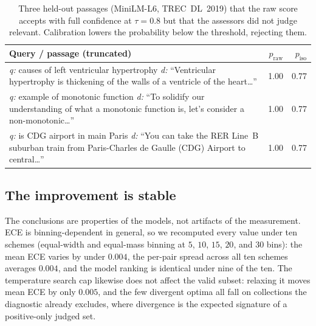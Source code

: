 \documentclass[sigconf,nonacm]{acmart}
\newcommand{\thead}[1]{\textbf{#1}}
\begin{document}
\begin{table}[t]
\centering
\caption{Three held-out passages (MiniLM-L6, TREC~DL~2019) that the raw score accepts
with full confidence at $\tau{=}0.8$ but that the assessors did not judge relevant.
Calibration lowers the probability below the threshold, rejecting them.}
\label{tab:cases}
\small
\renewcommand{\arraystretch}{1.15}
\begin{tabular}{p{}rr}
\toprule
\thead{Query / passage (truncated)} & \thead{$p_{\text{raw}}$} & \thead{$p_{\text{iso}}$} \\
\midrule
\emph{q:} causes of left ventricular hypertrophy \newline
\emph{d:} ``Ventricular hypertrophy is thickening of the walls of a ventricle of the
heart\ldots'' & 1.00 & 0.77 \\
\midrule
\emph{q:} example of monotonic function \newline
\emph{d:} ``To solidify our understanding of what a monotonic function is, let's
consider a non-monotonic\ldots'' & 1.00 & 0.77 \\
\midrule
\emph{q:} is CDG airport in main Paris \newline
\emph{d:} ``You can take the RER Line~B suburban train from Paris-Charles de Gaulle
(CDG) Airport to central\ldots'' & 1.00 & 0.77 \\
\bottomrule
\end{tabular}
\end{table}

\subsection{The improvement is stable}\label{sec:robust}
The conclusions are properties of the models, not artifacts of the measurement. ECE
is binning-dependent in general, so we recomputed every value under ten schemes
(equal-width and equal-mass binning at $5$, $10$, $15$, $20$, and $30$ bins): the mean
ECE varies by under $0.004$, the per-pair spread across all ten schemes averages
$0.004$, and the model ranking is identical under nine of the ten. The temperature
search cap likewise does not affect the valid subset: relaxing it moves mean ECE by
only $0.005$, and the few divergent optima all fall on collections the diagnostic
already excludes, where divergence is the expected signature of a positive-only
judged set.
\end{document}

